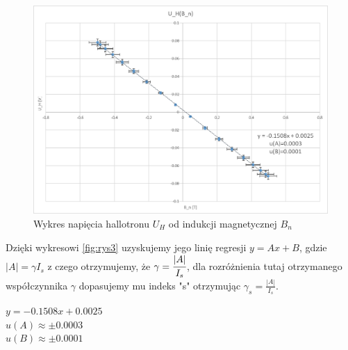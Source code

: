 \documentclass{article}
\begin{document}
\begin{figure}[h!]
    \centering
    \includegraphics{U_H_od_B_n.png}
    \caption{Wykres napięcia hallotronu $U_{H}$ od indukcji magnetycznej $B_{n}$ }
    \label{fig:rys5}
\end{figure}{}
Dzięki wykresowi \ref{fig:rys3} uzyskujemy jego linię regresji $y=Ax+B$, gdzie $|A|=\gamma I_{s}$ z czego otrzymujemy, że $\gamma=\cfrac{|A|}{I_{s}}$, dla rozróżnienia tutaj otrzymanego współczynnika $\gamma$ dopasujemy mu indeks "s" otrzymując $\gamma_{s}=\frac{|A|}{I_{s}}$.
\begin{center}
    $y=-0.1508x+0.0025$\\
    $u(A)\approx\pm0.0003$\\
    $u(B)\approx\pm0.0001$
\end{center}


\newpage
\end{document}

